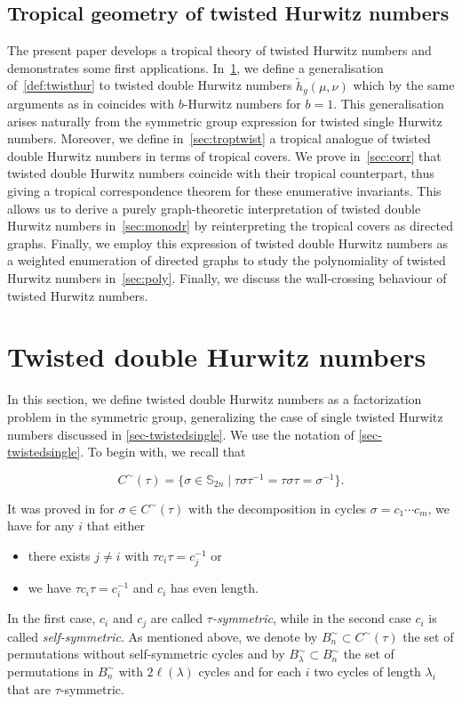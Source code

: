 \documentclass[10pt]{amsart}
\theoremstyle{plain}
\theoremstyle{definition}
\theoremstyle{definition}
\theoremstyle{plain}
\theoremstyle{plain}
\theoremstyle{remark}
\theoremstyle{plain}
\theoremstyle{plain}
\begin{document}
\subsection{Tropical geometry of twisted Hurwitz numbers} 
The present paper develops a tropical theory of twisted Hurwitz numbers and demonstrates some first applications. In~\cref{sec:twistdoub}, we define a generalisation of~\cref{def:twisthur} to twisted double Hurwitz numbers $\tilde{h}_g(\mu,\nu)$ which by the same arguments as in \cite[Theorem 3.2]{BF21} coincides with $b$-Hurwitz numbers for $b=1$. This generalisation arises naturally from the symmetric group expression for twisted single Hurwitz numbers. Moreover, we define in~\cref{sec:troptwist} a tropical analogue of twisted double Hurwitz numbers in terms of tropical covers. We prove in~\cref{sec:corr} that twisted double Hurwitz numbers coincide with their tropical counterpart, thus giving a tropical correspondence theorem for these enumerative invariants. This allows us to derive a purely graph-theoretic interpretation of twisted double Hurwitz numbers in~\cref{sec:monodr} by reinterpreting the tropical covers as directed graphs.
Finally, we employ this expression of twisted double Hurwitz numbers as a weighted enumeration of directed graphs to study the polynomiality of twisted Hurwitz numbers in~\cref{sec:poly}. Finally, we discuss the wall-crossing behaviour of twisted Hurwitz numbers.

\section{Twisted double Hurwitz numbers}
\label{sec:twistdoub}
In this section, we define twisted double Hurwitz numbers as a factorization problem in the symmetric group, generalizing the case of single twisted Hurwitz numbers discussed in \cref{sec-twistedsingle}. We use the notation of \cref{sec-twistedsingle}. To begin with, we recall that

\begin{equation*}
     C^\sim(\tau)=\{\sigma\in \mathbb{S}_{2n}  \mid  \tau \sigma \tau^{-1} = \tau \sigma \tau =  \sigma^{-1}\}.
\end{equation*}

It was proved in \cite[Lemma 2.1]{BF21} for $\sigma \in C^\sim(\tau)$ with the decomposition in cycles $\sigma=c_1\cdots c_m$, we have for any $i$ that either
\begin{itemize}
    \item there exists $j\neq i$ with $\tau c_i\tau=c_j^{-1}$ or
    \item we have $\tau c_i\tau=c_i^{-1}$ and $c_i$ has even length.
\end{itemize}
In the first case, $c_i$ and $c_j$ are called \textit{$\tau$-symmetric}, while in the second case $c_i$ is called \textit{self-symmetric}. As mentioned above, we denote by $B_n^\sim\subset C^\sim(\tau)$ the set of permutations without self-symmetric cycles and by $B^\sim_\lambda\subset B^\sim_n$ the set of permutations in $B^\sim_n$ with $2\ell(\lambda)$ cycles and for each $i$ two cycles of length $\lambda_i$ that are $\tau$-symmetric.
\end{document}
